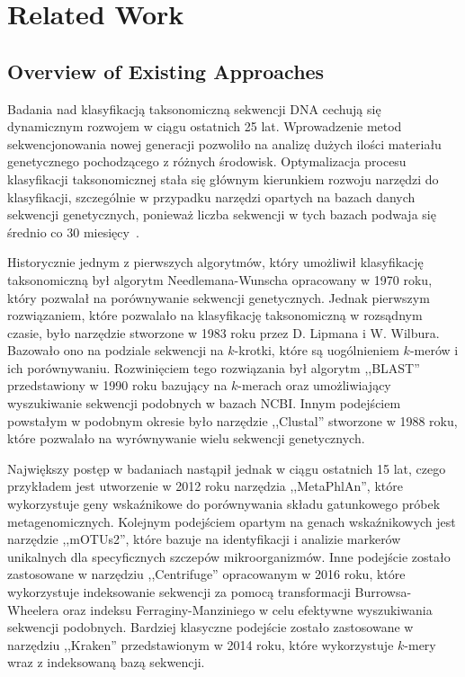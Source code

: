 \documentclass{article}
\newcommand{\temporary}[1]{
    \begin{tcolorbox}[colframe=red, colback=white, title={\textbf{WERSJA PO POLSKU}}, sharp corners=south]
        #1
    \end{tcolorbox}
}
\begin{document}
    \clearpage
    \section{Related Work}

        \subsection{Overview of Existing Approaches}

            \temporary{
                Badania nad klasyfikacją taksonomiczną sekwencji DNA cechują się dynamicznym rozwojem w ciągu ostatnich 25 lat. Wprowadzenie metod sekwencjonowania nowej generacji pozwoliło na analizę dużych ilości materiału genetycznego pochodzącego z różnych środowisk. Optymalizacja procesu klasyfikacji taksonomicznej stała się głównym kierunkiem rozwoju narzędzi do klasyfikacji, szczególnie w przypadku narzędzi opartych na bazach danych sekwencji genetycznych, ponieważ liczba sekwencji w tych bazach podwaja się średnio co 30 miesięcy~\cite{Benson:2008}.

        Historycznie jednym z pierwszych algorytmów, który umożliwił klasyfikację taksonomiczną był algorytm Needlemana-Wunscha\cite{Needleman:1970} opracowany w 1970 roku, który pozwalał na porównywanie sekwencji genetycznych. Jednak pierwszym rozwiązaniem, które pozwalało na klasyfikację taksonomiczną w rozsądnym czasie, było narzędzie stworzone w 1983 roku przez D. Lipmana i W. Wilbura\cite{Wilbur:1983}. Bazowało ono na podziale sekwencji na $k$-krotki, które są uogólnieniem $k$-merów i ich porównywaniu. Rozwinięciem tego rozwiązania był algorytm ,,BLAST'' przedstawiony w 1990 roku\cite{Altschul:1990} bazujący na $k$-merach oraz umożliwiający wyszukiwanie sekwencji podobnych w bazach NCBI. Innym podejściem powstałym w podobnym okresie było narzędzie ,,Clustal''\cite{Higgins:1988} stworzone w 1988 roku, które pozwalało na wyrównywanie wielu sekwencji genetycznych.

        Największy postęp w badaniach nastąpił jednak w ciągu ostatnich 15 lat, czego przykładem jest utworzenie w 2012 roku narzędzia ,,MetaPhlAn''\cite{Segata:2012}, które wykorzystuje geny wskaźnikowe do porównywania składu gatunkowego próbek metagenomicznych. Kolejnym podejściem opartym na genach wskaźnikowych jest narzędzie ,,mOTUs2''\cite{Milanese:2019}, które bazuje na identyfikacji i analizie markerów unikalnych dla specyficznych szczepów mikroorganizmów. Inne podejście zostało zastosowane w narzędziu ,,Centrifuge''\cite{Kim:2016} opracowanym w 2016 roku, które wykorzystuje indeksowanie sekwencji za pomocą transformacji Burrowsa-Wheelera\cite{Burrows:1994} oraz indeksu Ferraginy-Manziniego\cite{Ferragina:2000} w celu efektywne wyszukiwania sekwencji podobnych. Bardziej klasyczne podejście zostało zastosowane w narzędziu ,,Kraken''\cite{Wood:2014} przedstawionym w 2014 roku, które wykorzystuje $k$-mery wraz z indeksowaną bazą sekwencji.

}
\end{document}
